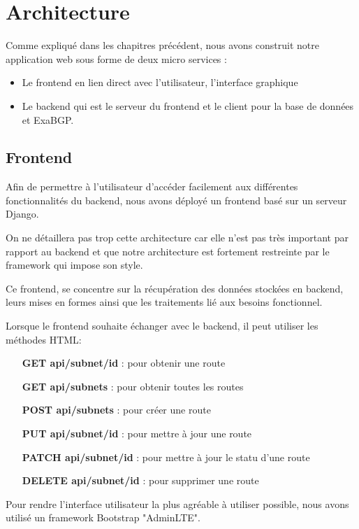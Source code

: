 \chapter{Architecture}
Comme expliqué dans les chapitres précédent, nous avons construit notre application web sous forme de deux micro services :
\begin{itemize}
    \item Le frontend en lien direct avec l'utilisateur, l'interface graphique
    \item Le backend qui est le serveur du frontend et le client pour la base de données et ExaBGP.
\end{itemize}

\section{Frontend}
Afin de permettre à l'utilisateur d'accéder facilement aux différentes fonctionnalités du backend, nous avons déployé un frontend basé sur un serveur Django.

On ne détaillera pas trop cette architecture car elle n'est pas très important par rapport au backend et que notre architecture est fortement restreinte par le framework qui impose son style.

Ce frontend, se concentre sur la récupération des données stockées en backend, leurs mises en formes ainsi que les traitements lié aux besoins fonctionnel.

Lorsque le frontend souhaite échanger avec le backend, il peut utiliser les méthodes HTML:
\begin{itemize}
    \item [\textbf{GET api/subnet/id}] : pour obtenir une route
    \item [\textbf{GET api/subnets}] : pour obtenir toutes les routes
    \item [\textbf{POST api/subnets}] : pour créer une route
    \item [\textbf{PUT api/subnet/id}] : pour mettre à jour une route
    \item [\textbf{PATCH api/subnet/id}] : pour mettre à jour le statu d'une route
    \item [\textbf{DELETE api/subnet/id}] : pour supprimer une route\newline
\end{itemize}

Pour rendre l'interface utilisateur la plus agréable à utiliser possible, nous avons utilisé un framework Bootstrap "AdminLTE".

